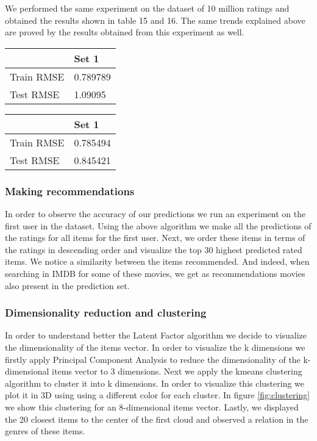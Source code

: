 \documentclass[a4paper]{article}
\begin{document}
We performed the same experiment on the dataset of 10 million ratings and obtained the results shown in table 15 and 16. The same trends explained above are proved by the results obtained from this experiment as well.
\begin{center}
    \begin{tabular}{| l | l |}
    \hline
     & Set 1   \\ \hline
    Train RMSE & 0.789789  \\ \hline
    Test RMSE & 1.09095  \\ \hline
    \hline
    \end{tabular}
\end{center}

\begin{center}
    \begin{tabular}{| l | l |}
    \hline
     & Set 1   \\ \hline
    Train RMSE & 0.785494  \\ \hline
    Test RMSE & 0.845421  \\ \hline
    \hline
    \end{tabular}
\end{center}

\subsubsection*{Making recommendations}
In order to observe the accuracy of our predictions we run an experiment on the first user in the dataset. Using the above algorithm we make all the predictions of the ratings for all items for the first user. Next, we order these items in terms of the ratings in descending order and visualize the top 30 highest predicted rated items. We notice a similarity between the items recommended. And indeed, when searching in IMDB for some of these movies, we get as recommendations movies also present in the prediction set. 

\subsubsection*{Dimensionality reduction and clustering}
In order to understand better the Latent Factor algorithm we decide to visualize the dimensionality of the items vector. In order to visualize the k dimensions we firstly apply Principal Component Analysis to reduce the dimensionality of the k-dimensional items vector to 3 dimensions. Next we apply the kmeans clustering algorithm to cluster it into k dimensions. In order to visualize this clustering we plot it in 3D using using a different color for each cluster. In figure \ref{fig:clustering} we show this clustering for an 8-dimensional items vector. 
Lastly, we displayed the 20 closest items to the center of the first cloud and observed a relation in the genres of these items.
\end{document}
